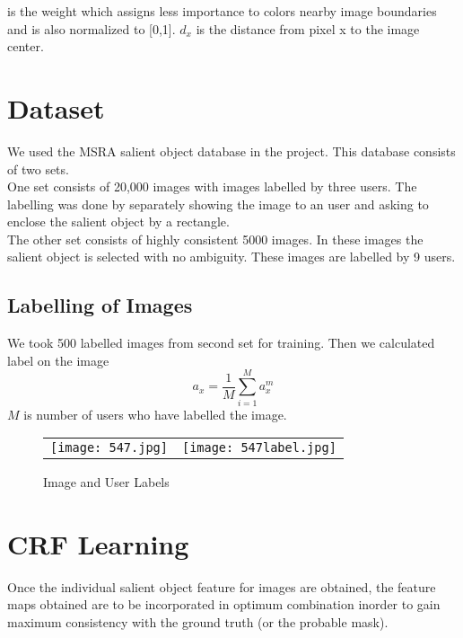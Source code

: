 \documentclass[11pt]{report}
\begin{document}
is the weight which assigns less importance to colors nearby image boundaries and is also normalized to [0,1].
$d_x$ is the distance from pixel x to the image center.

\section*{Dataset}
We used the MSRA salient object database in the project. This database consists of two sets. \\
One set consists of 20,000 images with images labelled by three users. The labelling was done by separately showing the image to an user and asking to enclose the salient object by a rectangle.\\
The other set consists of highly consistent 5000 images. In these images the salient object is selected with no ambiguity. These images are labelled by 9 users. \\

\subsection*{Labelling of Images }
We took 500 labelled images from second set for training. Then we calculated label on the image
\begin{equation}
a_x =\frac{1}{M} \sum_{i = 1}^{M}a_{x}^{m}
\end{equation}
$M$ is number of users who have labelled the image.\\		 
\begin{figure}[h!]
\center
\begin{tabular}{cc}
\texttt{[image: 547.jpg]} 
& \texttt{[image: 547label.jpg]}
\end{tabular}
\label{tab:gt}
\caption{Image and User Labels}
\end{figure}

\section*{CRF Learning}
Once the individual salient object feature for images are obtained,
the feature maps obtained are to be incorporated in optimum combination
inorder to gain maximum  consistency with the ground truth (or the probable mask).\\
\end{document}
